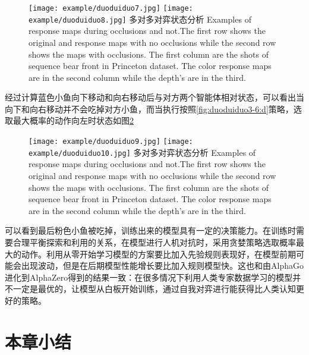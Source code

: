 \begin{figure}[!hpbt]
	\centering
	{\texttt{[image: example/duoduiduo7.jpg]}}
	\hspace{0.5em}
	{\texttt{[image: example/duoduiduo8.jpg]}}
	\bicaption
	{多对多对弈状态分析}
	{Examples of response maps during occlusions and not.The first row shows the original and response maps with no occlusions while the second row shows the maps with occlusions. The first column are the shots of sequence bear front in Princeton dataset. The color response maps are in the second column while the depth’s are in the third.}
	\label{fig2:duoduiduo}
\end{figure}
经过计算蓝色小鱼向下移动和向右移动后与对方两个智能体相对状态，可以看出当向下和向右移动并不会吃掉对方小鱼，而当执行按照\ref{fig:duoduiduo3-6:d}策略，选取最大概率的动作向左时状态如图\ref{fig3:duoduiduo}
\begin{figure}[!hpbt]
	\centering
	{\texttt{[image: example/duoduiduo9.jpg]}}
	\hspace{0.5em}
	{\texttt{[image: example/duoduiduo10.jpg]}}
	\bicaption
	{多对多对弈状态分析}
	{Examples of response maps during occlusions and not.The first row shows the original and response maps with no occlusions while the second row shows the maps with occlusions. The first column are the shots of sequence bear front in Princeton dataset. The color response maps are in the second column while the depth’s are in the third.}
	\label{fig3:duoduiduo}
\end{figure}
可以看到最后粉色小鱼被吃掉，训练出来的模型具有一定的决策能力。在训练时需要合理平衡探索和利用的关系，在模型进行人机对抗时，采用贪婪策略选取概率最大的动作。利用从零开始学习模型的方案要比加入先验规则表现好，在模型前期可能会出现波动，但是在后期模型性能增长要比加入规则模型快。这也和由AlphaGo进化到AlphaZero得到的结果一致：在很多情况下利用人类专家数据学习的模型并不一定是最优的，让模型从白板开始训练，通过自我对弈进行能获得比人类认知更好的策略。
\section{本章小结}


